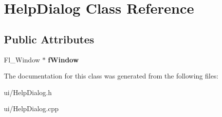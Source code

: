 \hypertarget{classHelpDialog}{\section{\-Help\-Dialog \-Class \-Reference}
\label{classHelpDialog}
}
\subsection*{\-Public \-Attributes}
\begin{DoxyCompactItemize}
\item 
\hypertarget{classHelpDialog_a3bac908e5b8d17fc0904855f7931e6b0}{\-Fl\-\_\-\-Window $\ast$ {\bfseries f\-Window}}\label{classHelpDialog_a3bac908e5b8d17fc0904855f7931e6b0}

\end{DoxyCompactItemize}


\-The documentation for this class was generated from the following files\-:\begin{DoxyCompactItemize}
\item 
ui/\-Help\-Dialog.\-h\item 
ui/\-Help\-Dialog.\-cpp\end{DoxyCompactItemize}
